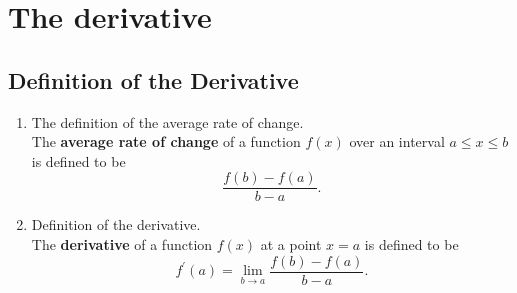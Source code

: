 \chapter{The derivative}
\section{Definition of the Derivative}
\begin{enumerate}
    \item The definition of the average rate of change. \\
        The \textbf{average rate of change} of a function $f(x)$ over an interval $a\leq x\leq b$ is defined to be
        $$
        \frac{f(b)-f(a)}{b-a}.
        $$
    \item Definition of the derivative. \\
        The \textbf{derivative} of a function $f(x)$ at a point $x=a$ is defined to be
        $$
        f^\prime(a)=\lim_{b\to a}\frac{f(b)-f(a)}{b-a}.
        $$
\end{enumerate}
